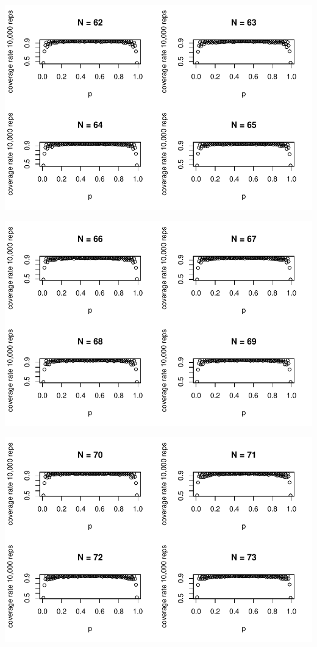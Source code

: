 \documentclass{article}\usepackage[]{graphicx}\usepackage[]{color}
\makeatletter
\def\maxwidth{ %
  \ifdim\Gin@nat@width>\linewidth
    \linewidth
  \else
    \Gin@nat@width
  \fi
}
\newenvironment{knitrout}{}{} %
\makeatother
\begin{document}
\begin{enumerate}
\begin{knitrout}
{}




{\centering \includegraphics[width=\maxwidth]{figure/prob1_final-5} 

}




{\centering \includegraphics[width=\maxwidth]{figure/prob1_final-6} 

}




{\centering \includegraphics[width=\maxwidth]{figure/prob1_final-7} 

}
\end{knitrout}
\end{enumerate}
\end{document}

